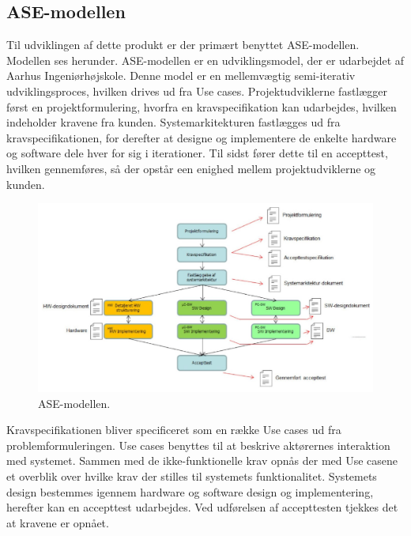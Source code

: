 \subsection{ASE-modellen}
Til udviklingen af dette produkt er der primært benyttet ASE-modellen. Modellen ses herunder. ASE-modellen er en udviklingsmodel, der er udarbejdet af Aarhus Ingeniørhøjskole. Denne model er en mellemvægtig semi-iterativ udviklingsproces, hvilken drives ud fra Use cases. Projektudviklerne fastlægger først en projektformulering, hvorfra en kravspecifikation kan udarbejdes, hvilken indeholder kravene fra kunden. Systemarkitekturen fastlægges ud fra kravspecifikationen, for derefter at designe og implementere de enkelte hardware og software dele hver for sig i iterationer. Til sidst fører dette til en accepttest, hvilken gennemføres, så der opstår een enighed mellem projektudviklerne og kunden.
\begin{figure}[H]
\includegraphics[width =1.0\textwidth , center]{billeder/ASEmodellen}
\caption{ASE-modellen.}
\end{figure} 
Kravspecifikationen bliver specificeret som en række Use cases ud fra problemformuleringen. Use cases benyttes til at beskrive aktørernes interaktion med systemet. Sammen med de ikke-funktionelle krav opnås der med Use casene et overblik over hvilke krav der stilles til systemets funktionalitet. Systemets design bestemmes igennem hardware og software design og implementering, herefter kan en accepttest udarbejdes. Ved udførelsen af accepttesten tjekkes det at kravene er opnået.
